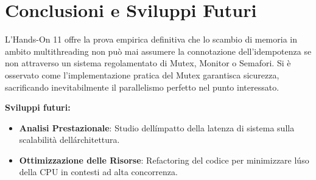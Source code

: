 \documentclass[a4paper,12pt]{article}
\begin{document}
\section{Conclusioni e Sviluppi Futuri}
L'Hands-On 11 offre la prova empirica definitiva che lo scambio di memoria in ambito multithreading non può mai assumere la connotazione dell'idempotenza se non attraverso un sistema regolamentato di Mutex, Monitor o Semafori. Si è osservato come l'implementazione pratica del Mutex garantisca sicurezza, sacrificando inevitabilmente il parallelismo perfetto nel punto interessato.

\noindent \textbf{Sviluppi futuri:}
\begin{itemize}
    \item \textbf{Analisi Prestazionale}: Studio dell\'impatto della latenza di sistema sulla scalabilità dell\'architettura.
    \item \textbf{Ottimizzazione delle Risorse}: Refactoring del codice per minimizzare l\'uso della CPU in contesti ad alta concorrenza.
\end{itemize}
\end{document}
